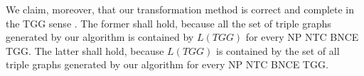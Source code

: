 We claim, moreover, that our transformation method is correct and complete in the TGG sense \cite{Hermann2013}. The former shall hold, because all the set of triple graphs generated by our algorithm is contained by $L(TGG)$ for every NP NTC BNCE TGG. The latter shall hold, because $L(TGG)$ is contained by the set of all triple graphs generated by our algorithm for every NP NTC BNCE TGG.
